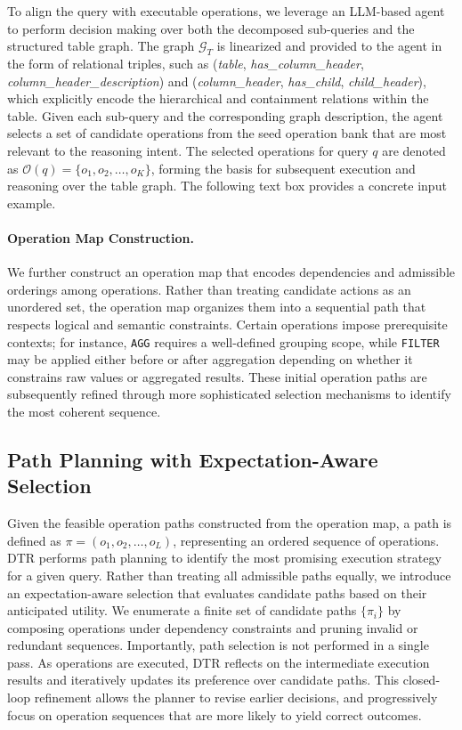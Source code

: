 To align the query with executable operations, we leverage an LLM-based agent to perform decision making over both the decomposed sub-queries and the structured table graph. The graph $\mathcal{G}_T$ is linearized and provided to the agent in the form of relational triples, such as
(\textit{table}, \textit{has\_column\_header}, \textit{column\_header\_description}) and
(\textit{column\_header}, \textit{has\_child}, \textit{child\_header}),
which explicitly encode the hierarchical and containment relations within the table. Given each sub-query and the corresponding graph description, the agent selects a set of candidate operations from the seed operation bank that are most relevant to the reasoning intent. The selected operations for query $q$ are denoted as $\mathcal{O}(q) = \{ o_1, o_2, \dots, o_K \}$, forming the basis for subsequent execution and reasoning over the table graph. The following text box provides a concrete input example. 

\paragraph{Operation Map Construction.}
We further construct an operation map that encodes dependencies and admissible orderings among operations. Rather than treating candidate actions as an unordered set, the operation map organizes them into a sequential path that respects logical and semantic constraints. Certain operations impose prerequisite contexts; for instance, \texttt{AGG} requires a well-defined grouping scope, while \texttt{FILTER} may be applied either before or after aggregation depending on whether it constrains raw values or aggregated results. These initial operation paths are subsequently refined through more sophisticated selection mechanisms to identify the most coherent sequence.


\subsection{Path Planning with Expectation-Aware Selection}
Given the feasible operation paths constructed from the operation map, a path is defined as $\pi = (o_1, o_2, \dots, o_L)$, representing an ordered sequence of operations. DTR performs path planning to identify the most promising execution strategy for a given query. Rather than treating all admissible paths equally, we introduce an expectation-aware selection that evaluates candidate paths based on their anticipated utility. We enumerate a finite set of candidate paths $\{\pi_i\}$ by composing operations under dependency constraints and pruning invalid or redundant sequences. Importantly, path selection is not performed in a single pass. As operations are executed, DTR reflects on the intermediate execution results and iteratively updates its preference over candidate paths. This closed-loop refinement allows the planner to revise earlier decisions, and progressively focus on operation sequences that are more likely to yield correct outcomes.


